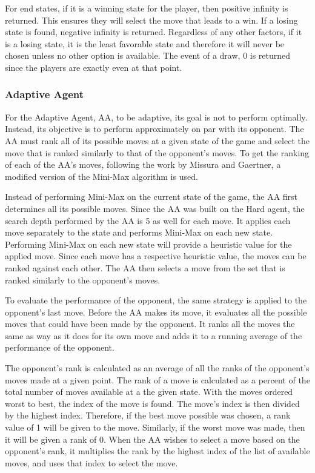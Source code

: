 \documentclass[12pt]{article}
\begin{document}
For end states, if it is a winning state for the player, then positive infinity is returned. This ensures they will select the move that leads to a win. If a losing state is found, negative infinity is returned. Regardless of any other factors, if it is a losing state, it is the least favorable state and therefore it will never be chosen unless no other option is available. The event of a draw, 0 is returned since the players are exactly even at that point.


\subsubsection*{Adaptive Agent}
For the Adaptive Agent, AA, to be adaptive, its goal is not to perform optimally. Instead, its objective is to perform approximately on par with its opponent. The AA must rank all of its possible moves at a given state of the game and select the move that is ranked similarly to that of the opponent's moves. To get the ranking of each of the AA's moves, following the work by Missura and Gaertner, a modified version of the Mini-Max algorithm is used.

Instead of performing Mini-Max on the current state of the game, the AA first determines all its possible moves. Since the AA was built on the Hard agent, the search depth performed by the AA is 5 as well for each move. It applies each move separately to the state and performs Mini-Max on each new state. Performing Mini-Max on each new state will provide a heuristic value for the applied move. Since each move has a respective heuristic value, the moves can be ranked against each other. The AA then selects a move from the set that is ranked similarly to the opponent's moves.

To evaluate the performance of the opponent, the same strategy is applied to the opponent's last move. Before the AA makes its move, it evaluates all the possible moves that could have been made by the opponent. It ranks all the moves the same as way as it does for its own move and adds it to a running average of the performance of the opponent.

The opponent's rank is calculated as an average of all the ranks of the opponent's moves made at a given point. The rank of a move is calculated as a percent of the total number of moves available at a the given state. With the moves ordered worst to best, the index of the move is found. The move's index is then divided by the highest index. Therefore, if the best move possible was chosen, a rank value of 1 will be given to the move. Similarly, if the worst move was made, then it will be given a rank of 0. When the AA wishes to select a move based on the opponent's rank, it multiplies the rank by the highest index of the list of available moves, and uses that index to select the move.
\end{document}
